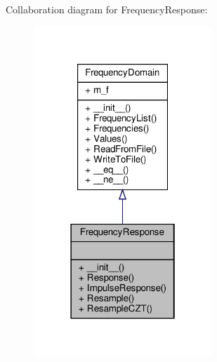 Collaboration diagram for Frequency\+Response\+:\nopagebreak
\begin{figure}[H]
\begin{center}
\leavevmode
\includegraphics[width=190pt]{classSignalIntegrity_1_1FrequencyDomain_1_1FrequencyResponse_1_1FrequencyResponse__coll__graph}
\end{center}
\end{figure}
